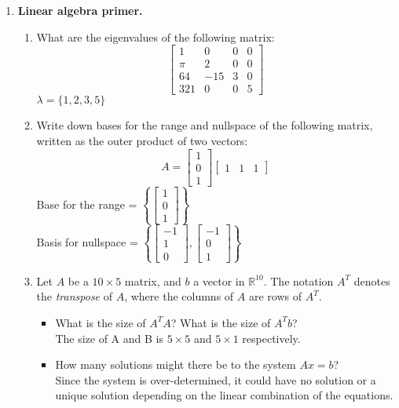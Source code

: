 \documentclass[11pt]{amsart}
\begin{document}
\begin{enumerate}
\item {\bf Linear algebra primer.}
\begin{enumerate}
\item What are the eigenvalues of the following matrix: 
\[
\begin{bmatrix}
1 & 0 & 0 & 0 \\
\pi & 2 & 0 & 0 \\
64 & -15 & 3 & 0 \\ 
321 & 0 & 0 & 5 
\end{bmatrix}
\]
$\lambda = \{1,2,3,5\}$ \\
\item Write down bases for the range and nullspace of the following matrix, written as the outer product of two vectors: 
\[
A = \begin{bmatrix}
1 \\ 0 \\ 1
\end{bmatrix} 
\begin{bmatrix}
1 & 1 & 1
\end{bmatrix} 
\]
Base for the range = $\left\{ \begin{bmatrix} 1 \\ 0 \\ 1\end{bmatrix}\right\}$ \\
\bigbreak
Basis for nullspace = $\left\{ \begin{bmatrix} -1 \\ 1 \\ 0\end{bmatrix}, \begin{bmatrix} -1 \\0 \\1 \end{bmatrix}\right\}$
\item Let $A$ be a $10 \times 5$ matrix, and $b$ a vector in $\mathbb{R}^{10}$.  The notation $A^T$ denotes the {\it transpose} of $A$, where the columns of $A$ are rows of $A^T$. 
\begin{itemize}
\item What is the size of $A^TA$? What is the size of $A^Tb$? \\
The size of A and B is $5 \times 5$ and $5 \times 1$ respectively. 
\item How many solutions might there be to the system $Ax = b$? \\
Since the system is over-determined, it could have no solution or a unique solution depending on the linear combination of the equations.

\end{itemize}
\end{enumerate}
\end{enumerate}
\end{document}
